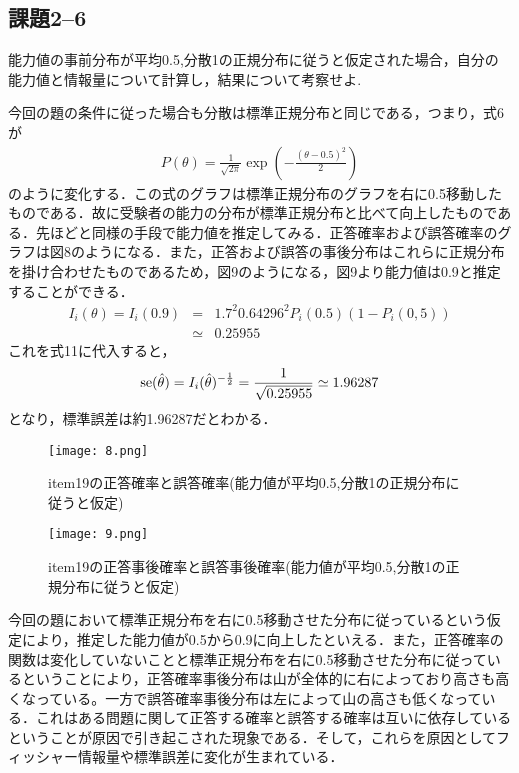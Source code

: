 \documentclass[12pt]{jarticle}
\begin{document}
\subsection{課題2–6}
\begin{shadebox}
    \quad 能力値の事前分布が平均0.5,分散1の正規分布に従うと仮定された場合，自分の能力値と情報量について計算し，結果について考察せよ.
\end{shadebox}
\vspace{\baselineskip}
今回の題の条件に従った場合も分散は標準正規分布と同じである，つまり，式6が
\begin{eqnarray}
    P(\theta)=\frac{1}{\sqrt{2\pi}}\exp \left(-\frac{(\theta-0.5) ^2}{2}\right)
\end{eqnarray}
のように変化する．この式のグラフは標準正規分布のグラフを右に0.5移動したものである．故に受験者の能力の分布が標準正規分布と比べて向上したものである．先ほどと同様の手段で能力値を推定してみる．正答確率および誤答確率のグラフは図8のようになる．また，正答および誤答の事後分布はこれらに正規分布を掛け合わせたものであるため，図9のようになる，図9より能力値は0.9と推定することができる．
\begin{eqnarray*}
    I_i(\theta)=I_i(0.9)
    &=&1.7^2 0.64296^2P_i(0.5)(1-P_i(0,5))\\
    &\simeq&0.25955
\end{eqnarray*}
これを式11に代入すると，
\begin{eqnarray*}
    {\rm se}(\hat{\theta})=I_i(\hat{\theta})^{-\frac{1}{2}}=\frac{1}{\sqrt{0.25955}}\simeq1.96287
\end{eqnarray*}
となり，標準誤差は約1.96287だとわかる．
\begin{figure}[h]
    \begin{center}
        \texttt{[image: 8.png]}
    \end{center}
    \caption{item19の正答確率と誤答確率(能力値が平均0.5,分散1の正規分布に従うと仮定)}
    \label{fig8}
\end{figure}
\begin{figure}[h]
    \begin{center}
        \texttt{[image: 9.png]}
    \end{center}
    \caption{item19の正答事後確率と誤答事後確率(能力値が平均0.5,分散1の正規分布に従うと仮定)}
    \label{fig9}
\end{figure}

今回の題において標準正規分布を右に0.5移動させた分布に従っているという仮定により，推定した能力値が0.5から0.9に向上したといえる．また，正答確率の関数は変化していないことと標準正規分布を右に0.5移動させた分布に従っているということにより，正答確率事後分布は山が全体的に右によっており高さも高くなっている。一方で誤答確率事後分布は左によって山の高さも低くなっている．これはある問題に関して正答する確率と誤答する確率は互いに依存しているということが原因で引き起こされた現象である．そして，これらを原因としてフィッシャー情報量や標準誤差に変化が生まれている．
\end{document}
